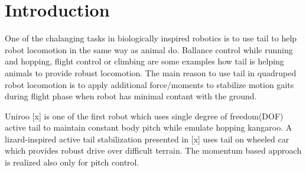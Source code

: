 \section{Introduction}\label{sec:introduction}

One of the chalanging tasks in biologically inspired robotics is to use tail to help robot locomotion in the same way as animal do. Ballance control while running and hopping, flight control or climbing are some examples how tail is helping animals to provide robust locomotion. The main reason to use tail in quadruped robot locomotion is to apply additional force/moments to stabilize motion gaits during flight phase when robot has minimal contant with the ground. 

Uniroo [x] is one of the first robot which uses single degree of freedom(DOF) active tail to maintain constant body pitch while emulate hopping kangaroo. A lizard-inspired active tail stabilization presented in [x] uses tail on wheeled car which provides robust drive over difficult terrain. The momentum based approach is realized also only for pitch control. 
